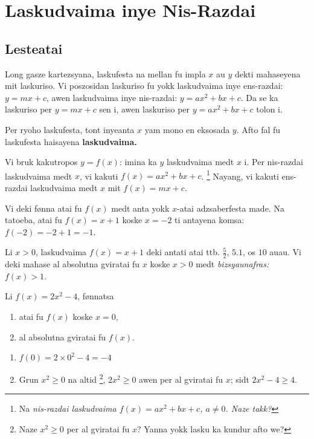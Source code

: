 \chapter{Laskudvaima inye Nis-Razdai}

\section{Lesteatai}

Long gasze kartezsyana, laskufesta na mellan fu impla \(x\) au \(y\) dekti mahaseyena mit laskuriso.
Vi poszosidan laskuriso fu yokk laskudvaima inye ens-razdai: \(y = mx + c\), awen laskudvaima inye
nis-razdai: \(y = ax^2 + bx + c\). Da se ka laskuriso per \(y = mx + c\) sen i, awen laskuriso per
\(y = ax^2 + bx + c\) tolon i.

Per ryoho laskufesta, tont inyeanta \(x\) yam mono en eksosada \(y\).
Afto fal fu laskufesta haisayena \bf{laskudvaima}.

Vi bruk kakutropos \(y = f\left(x\right)\): imina ka \(y\) laskudvaima medt \(x\) i.
Per nis-razdai laskudvaima medt \(x\), vi kakuti
\(f\left(x\right) = ax^2 + bx + c\). \footnote{Na \it{nis-razdai} laskudvaima \(f\left(x\right)=ax^2+bx+c\), \(a\neq0\). Naze takk?}
Nayang, vi kakuti ens-razdai laskudvaima medt \(x\) mit \(f\left(x\right) = mx + c\).

Vi deki fønna atai fu \(f\left(x\right)\) medt anta yokk \(x\)-atai adzsaberfesta made.
Na tatoeba, atai fu \(f\left(x\right) = x + 1\) koske \(x = -2\) ti antayena komsa: \(f\left(-2\right)=-2+1=-1\).

Li \(x > 0\), laskudvaima \(f\left(x\right) = x + 1\) deki antati atai ttb. \(\frac{5}{2}\), \(5.1\), os \(10\) auau.
Vi deki mahase al absolutna gviratai fu \(x\) koske \(x > 0\) medt \it{bizsyaunafras}: \(f\left(x\right) > 1\).

\begin{lyenszi}
  Li \(f\left(x\right)=2x^2-4\), fønnatsa
  \begin{enumerate}
    \item atai fu \(f\left(x\right)\) koske \(x=0\),
    \item al absolutna gviratai fu \(f\left(x\right)\).
  \end{enumerate}
\end{lyenszi}

  \begin{enumerate}
    \item \(f\left(0\right) = 2\times0^2 - 4 = -4\)
    \item Grun \(x^2\geq0\) na altid \footnote{Naze \(x^2\geq0\) per al gviratai fu \(x\)? Yanna yokk lasku ka kundur afto we?}, \(2x^2\geq0\) awen per al gviratai fu \(x\); sidt \(2x^2-4\geq4\).
  \end{enumerate}


